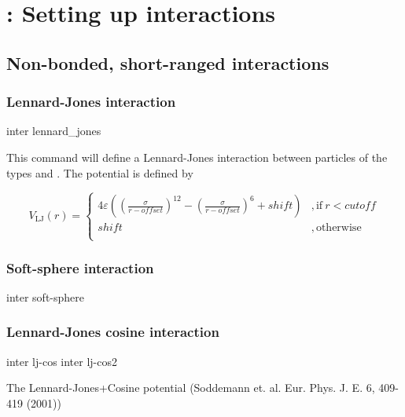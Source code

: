 \chapter{: Setting up interactions}
\label{sec:inter}

\section{Non-bonded, short-ranged interactions}
\label{sec:inter-nb}

\subsection{Lennard-Jones interaction}

\begin{essyntax}
  inter  
  lennard_jones 
  \var{$\epsilon$} \var{$\sigma$} 
    
\end{essyntax}
This command will define a Lennard-Jones interaction between particles
of the types  and .  The potential is defined by

\begin{equation}
  V_\mathrm{LJ}(r) = \left\{
    \begin{array}{ll}
      4\varepsilon((\frac{\sigma}{r-\mathit{offset}})^{12}
      -(\frac{\sigma}{r-\mathit{offset}})^6+\mathit{shift}) 
      & \mathrm{, if~} r < \mathit{cutoff}\\
      \mathit{shift} 
      & \mathrm{, otherwise}\\
    \end{array}
  \right.
\end{equation}

\subsection{Soft-sphere interaction}
\begin{essyntax}
  inter   
  soft-sphere    
\end{essyntax}

\subsection{Lennard-Jones cosine interaction}
\begin{essyntax}
  inter   lj-cos
     
  inter   lj-cos2
     \var{$\omega$}
\end{essyntax}
The Lennard-Jones+Cosine potential 
(Soddemann et. al. Eur. Phys. J. E. 6, 409-419 (2001))

